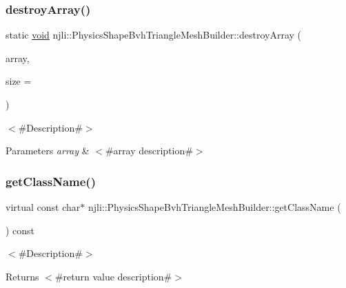 \subsubsection{\texorpdfstring{destroy\+Array()}{destroyArray()}}
{\footnotesize\ttfamily static \mbox{\hyperlink{_thread_8h_af1e856da2e658414cb2456cb6f7ebc66}{void}} njli\+::\+Physics\+Shape\+Bvh\+Triangle\+Mesh\+Builder\+::destroy\+Array (\begin{DoxyParamCaption}\item[{\mbox{\hyperlink{classnjli_1_1_physics_shape_bvh_triangle_mesh_builder}{Physics\+Shape\+Bvh\+Triangle\+Mesh\+Builder}} $\ast$$\ast$}]{array,  }\item[{const \mbox{\hyperlink{_util_8h_a10e94b422ef0c20dcdec20d31a1f5049}{u32}}}]{size = {} }\end{DoxyParamCaption})\hspace{0.3cm}{\ttfamily [static]}}

$<$\#\+Description\#$>$


\begin{DoxyParams}{Parameters}
{\em array} & $<$\#array description\#$>$ \\
\hline
\end{DoxyParams}
\mbox{\label{classnjli_1_1_physics_shape_bvh_triangle_mesh_builder_a45f239131aefd54239593232c7926dcf}} 
\subsubsection{\texorpdfstring{get\+Class\+Name()}{getClassName()}}
{\footnotesize\ttfamily virtual const char$\ast$ njli\+::\+Physics\+Shape\+Bvh\+Triangle\+Mesh\+Builder\+::get\+Class\+Name (\begin{DoxyParamCaption}{ }\end{DoxyParamCaption}) const\hspace{0.3cm}{\ttfamily [virtual]}}

$<$\#\+Description\#$>$

\begin{DoxyReturn}{Returns}
$<$\#return value description\#$>$ 
\end{DoxyReturn}



